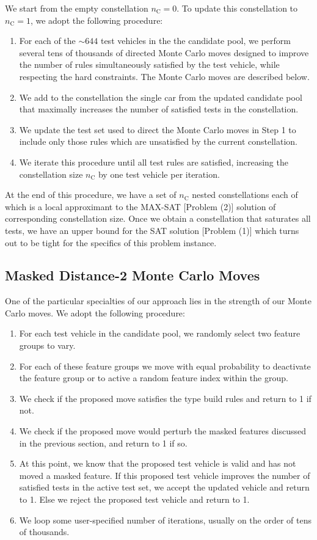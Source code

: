 \documentclass[aps,prl,twocolumn,superscriptaddress,groupedaddress]{revtex4}  %
\begin{document}
We start from the empty constellation $n_{\mathrm{C}} = 0$. To update this
constellation to $n_{\mathrm{C}} = 1$, we adopt the following procedure:
\begin{enumerate}
\item For each of the $\sim 644$ test vehicles in the the candidate pool, we
perform several tens of thousands of directed Monte Carlo moves designed to
improve the number of rules simultaneously satisfied by the test vehicle, while
respecting the hard constraints. The Monte Carlo moves are described below.
\item We add to the constellation the single car from the updated candidate pool
that maximally increases the number of satisfied tests in the constellation.
\item We update the test set used to direct the Monte Carlo moves in Step 1 to
include only those rules which are unsatisfied by the current constellation.
\item We iterate this procedure until all test rules are satisfied, increasing
the constellation size $n_{\mathrm{C}}$ by one test vehicle per iteration.
\end{enumerate}
At the end of this procedure, we have a set of $n_{\mathrm{C}}$ nested
constellations each of which is a local approximant to the MAX-SAT [Problem (2)]
solution of corresponding constellation size. Once we obtain a constellation
that saturates all tests, we have an upper bound for the SAT solution [Problem
(1)] which turns out to be tight for the specifics of this problem instance.

\subsection{Masked Distance-2 Monte Carlo Moves}

One of the particular specialties of our approach lies in the strength of our
Monte Carlo moves. We adopt the following procedure:
\begin{enumerate}
\item For each test vehicle in the candidate pool, we randomly select two
feature groups to vary.
\item For each of these feature groups we move with equal probability to
deactivate the feature group or to active a random feature index within the
group.
\item We check if the proposed move satisfies the type build rules and return to
1 if not.
\item We check if the proposed move would perturb the masked features discussed
in the previous section, and return to 1 if so. 
\item At this point, we know that the proposed test vehicle is valid and has not
moved a masked feature. If this proposed test vehicle improves the number of
satisfied tests in the active test set, we accept the updated vehicle and return
to 1. Else we reject the proposed test vehicle and return to 1.
\item We loop some user-specified number of iterations, usually on the order of
tens of thousands.
\end{enumerate}
\end{document}
